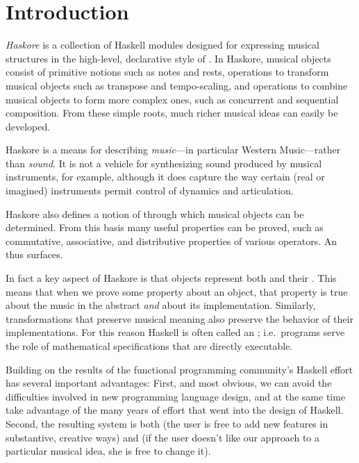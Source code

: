 \section{Introduction}

{\em Haskore} is a collection of Haskell modules designed for
expressing musical structures in the high-level, declarative style of
 .  In Haskore, musical objects consist of
primitive notions such as notes and rests, operations to transform
musical objects such as transpose and tempo-scaling, and operations to
combine musical objects to form more complex ones, such as concurrent
and sequential composition.  From these simple roots, much richer
musical ideas can easily be developed.

Haskore is a means for describing {\em music}---in particular Western
Music---rather than {\em sound}.  It is not a vehicle for synthesizing
sound produced by musical instruments, for example, although it does
capture the way certain (real or imagined) instruments permit control
of dynamics and articulation.

Haskore also defines a notion of  through
which  musical objects can be
determined.  From this basis many useful properties can be proved,
such as commutative, associative, and distributive properties of
various operators.  An  thus surfaces.

In fact a key aspect of Haskore is that objects represent both
 and their .
This means that when we prove some property about an object, that
property is true about the music in the abstract {\em and} about its
implementation.  Similarly, transformations that preserve musical
meaning also preserve the behavior of their implementations.  For this
reason Haskell is often called an ; i.e.~programs serve the role of mathematical specifications
that are directly executable.

Building on the results of the functional programming community's
Haskell effort has several important advantages: First, and most
obvious, we can avoid the difficulties involved in new programming
language design, and at the same time take advantage of the many years
of effort that went into the design of Haskell.  Second, the resulting
system is both  (the user is free to add new features
in substantive, creative ways) and  (if the user
doesn't like our approach to a particular musical idea, she is free to
change it).

